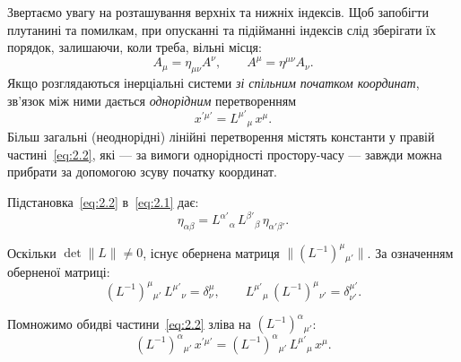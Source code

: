 Звертаємо увагу на розташування верхніх та нижніх індексів. Щоб запобігти плутанині та помилкам, при опусканні та
підійманні індексів слід зберігати їх порядок, залишаючи, коли треба, вільні місця:
\begin{equation*}
  A_\mu = \eta_{\mu\nu} A^\nu, \qquad
  A^\mu = \eta^{\mu\nu} A_\nu.
\end{equation*}
Якщо розглядаються інерціальні системи \textit{зі спільним початком координат}, зв'язок між ними дається
\textit{однорідним} перетворенням
\begin{equation}
  x^{\prime\mu'} = L^{\mu'}{}_\mu\, x^\mu.
  \label{eq:2.2}
\end{equation}
Більш загальні (неоднорідні) лінійні перетворення містять константи у правій частині~\eqref{eq:2.2}, які --- за вимоги
однорідності простору-часу --- завжди можна прибрати за допомогою зсуву початку координат.

Підстановка~\eqref{eq:2.2} в~\eqref{eq:2.1} дає:
\begin{equation}
  \eta_{\alpha\beta} = L^{\alpha'}{}_\alpha\, L^{\beta'}{}_\beta\, \eta_{\alpha'\beta'}.
  \label{eq:2.3}
\end{equation}

Оскільки $\det \|L\| \ne 0$, існує обернена матриця $\|(L^{-1})^{\mu}{}_{\mu'}\|$. За означенням оберненої матриці:
\begin{equation*}
  (L^{-1})^{\mu}{}_{\mu'} \, L^{\mu'}{}_{\nu} = \delta^{\mu}_{\nu}, \qquad
  L^{\mu'}{}_{\mu} \, (L^{-1})^{\mu}{}_{\nu'} = \delta^{\mu'}_{\nu'}.
\end{equation*}

Помножимо обидві частини~\eqref{eq:2.2} зліва на $(L^{-1})^{\alpha}{}_{\mu'}$:
\begin{equation*}
  (L^{-1})^{\alpha}{}_{\mu'} \, x^{\prime\mu'} = (L^{-1})^{\alpha}{}_{\mu'} \, L^{\mu'}{}_{\mu} \, x^{\mu}.
\end{equation*}

